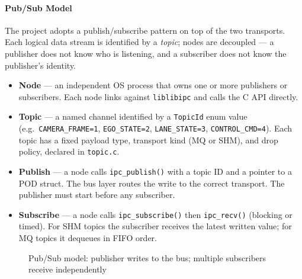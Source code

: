 \documentclass[12pt,a4paper]{article}
\begin{document}
\paragraph{Pub/Sub Model}

The project adopts a publish/subscribe pattern on top of the two transports.
Each logical data stream is identified by a \emph{topic}; nodes are decoupled — a publisher does not know
who is listening, and a subscriber does not know the publisher's identity.

\begin{itemize}
  \item \textbf{Node} --- an independent OS process that owns one or more publishers or subscribers.
        Each node links against \texttt{liblibipc} and calls the C API directly.
  \item \textbf{Topic} --- a named channel identified by a \texttt{TopicId} enum value (e.g.\
        \texttt{CAMERA\_FRAME=1}, \texttt{EGO\_STATE=2}, \texttt{LANE\_STATE=3}, \texttt{CONTROL\_CMD=4}).
        Each topic has a fixed payload type, transport kind (MQ or SHM), and drop policy, declared in \texttt{topic.c}.
  \item \textbf{Publish} --- a node calls \texttt{ipc\_publish()} with a topic ID and a pointer to a POD struct.
        The bus layer routes the write to the correct transport. The publisher must start before any subscriber.
  \item \textbf{Subscribe} --- a node calls \texttt{ipc\_subscribe()} then \texttt{ipc\_recv()} (blocking or timed).
        For SHM topics the subscriber receives the latest written value; for MQ topics it dequeues in FIFO order.
\end{itemize}

\begin{figure}[H]
\centering
{}
\caption{Pub/Sub model: publisher writes to the bus; multiple subscribers receive independently}
\end{figure}
\end{document}
